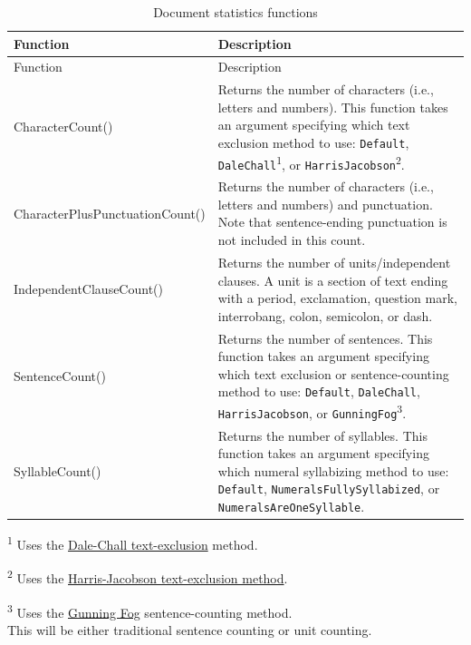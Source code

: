 \documentclass[
]{book}
\theoremstyle{definition}
\theoremstyle{definition}
\theoremstyle{definition}
\theoremstyle{definition}
\theoremstyle{remark}
\begin{document}
\begin{minipage}{\textwidth}

\begin{longtable}[]{@{}
  >{\raggedright\arraybackslash}p{}
  >{\raggedright\arraybackslash}p{}@{}}
\caption{Document statistics functions}\tabularnewline
\toprule
Function & Description \\
\midrule
\endfirsthead
\toprule
Function & Description \\
\midrule
\endhead
CharacterCount() & Returns the number of characters (i.e., letters and numbers). This function takes an argument specifying which text exclusion method to use: \texttt{Default}, \texttt{DaleChall}\textsuperscript{1}, or \texttt{HarrisJacobson}\textsuperscript{2}. \\
CharacterPlusPunctuationCount() & Returns the number of characters (i.e., letters and numbers) and punctuation. Note that sentence-ending punctuation is not included in this count. \\
IndependentClauseCount() & Returns the number of units/independent clauses. A unit is a section of text ending with a period, exclamation, question mark, interrobang, colon, semicolon, or dash. \\
SentenceCount() & Returns the number of sentences. This function takes an argument specifying which text exclusion or sentence-counting method to use: \texttt{Default}, \texttt{DaleChall}, \texttt{HarrisJacobson}, or \texttt{GunningFog}\textsuperscript{3}. \\
SyllableCount() & Returns the number of syllables. This function takes an argument specifying which numeral syllabizing method to use: \texttt{Default}, \texttt{NumeralsFullySyllabized}, or \texttt{NumeralsAreOneSyllable}. \\
\bottomrule
\end{longtable}

\textsuperscript{1} Uses the \protect\hyperlink{options-dale-chall}{Dale-Chall text-exclusion} method.

\textsuperscript{2} Uses the \protect\hyperlink{options-harris-jacobson}{Harris-Jacobson text-exclusion method}.

\textsuperscript{3} Uses the \protect\hyperlink{options-gunning-fog}{Gunning Fog} sentence-counting method.\\
This will be either traditional sentence counting or unit counting.

\end{minipage}
\end{document}

